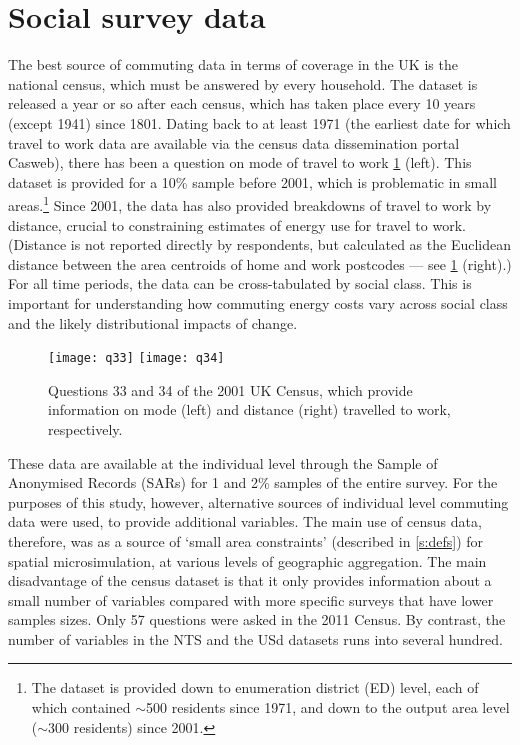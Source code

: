 \section{Social survey data}
\label{ssocialsurveydata}
The best source of commuting data in terms of coverage in the UK
is the national census, which must be answered by every household. The dataset is
released a year or so after
each census, which has taken place every 10 years (except 1941)
since 1801. Dating back to at least 1971 (the earliest date for which travel to
work data are available via the census data dissemination portal Casweb), there
has been a question on mode of travel to work \cref{fq33} (left).
This dataset is provided for a 10\% sample before 2001, which is
problematic in small areas.\footnote{The dataset is provided down to enumeration
district (ED) level, each of which contained $\sim$500 residents since 1971, and
down to the output area level ($\sim$300 residents) since 2001.} Since 2001,
the data has also provided breakdowns of travel to work by distance, crucial to
constraining estimates of energy use for travel to work. (Distance is not
reported directly by respondents, but calculated as the Euclidean distance
between the area centroids of home and work postcodes --- see \cref{fq33}
(right).) For all time periods, the data can be cross-tabulated by social class.
This is important for understanding how commuting energy costs vary across
social class and the likely distributional impacts of change. 

\begin{figure}[h]
 \centering
 \texttt{[image: q33]}
 \texttt{[image: q34]}
 \caption[Questions 33 and 34 of the 2001 UK Census]{Questions 33 and 34 of the
2001 UK Census, which provide information
on mode (left) and distance (right) travelled to work, respectively.}
 \label{fq33}
\end{figure}

These data are available at the individual level through the Sample of
Anonymised Records (SARs) for 1 and 2\% samples of the entire survey.
For the purposes of this study, however, alternative sources of individual
level commuting data were used, to provide additional variables. The main
use of census data, therefore, was as a source of `small area constraints'
(described in \cref{s:defs})
for spatial microsimulation, at various levels of geographic aggregation. 
The main disadvantage of the census
dataset is that it only provides information about a small number of variables
compared with more specific surveys that have lower samples sizes. Only 57
questions were asked in the 2011 Census. By contrast, the number of variables
in the NTS and the USd datasets runs into several hundred.

